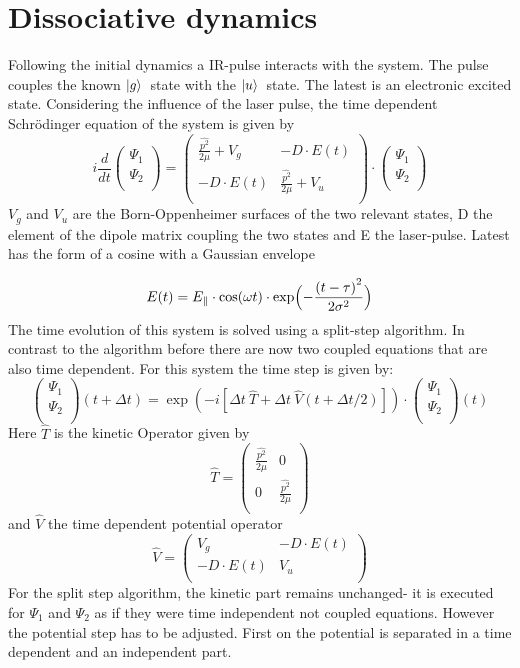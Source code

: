 \documentclass[12pt]{article}
\newcommand{\gr}{$\ket{g}$}
\newcommand{\us}{$\ket{u}$}
\newcommand{\psiv}{\begin{pmatrix}\Psi_1\\ \Psi_2\\ \end{pmatrix}}
\begin{document}
\section{Dissociative dynamics}
Following the initial dynamics a IR-pulse interacts with the system. The pulse couples  the known \gr \ state with the \us \ state. The latest is an electronic excited state. Considering the influence of the laser pulse, the time dependent Schr\"odinger equation of the system is given by
\begin{equation}
i
\frac{d}{dt}
\psiv
=
\begin{pmatrix}
\frac{\hat{p^2}}{2\mu}+V_g & -D\cdot E(t)\\
-D\cdot E(t) & \frac{\hat{p^2}}{2\mu}+V_u\\
\end{pmatrix}
\cdot
\psiv
\end{equation}
$V_g$ and $V_u$ are the Born-Oppenheimer surfaces of the two relevant states, D the element of the dipole matrix coupling the two states and E the laser-pulse.
Latest has the form of a cosine with a Gaussian envelope

\begin{equation}
   E(t)=E_\parallel \cdot \cos(\omega t) \cdot \exp \Bigl( -\frac{\left(t-\tau\right)^2}{2\sigma^2} \Bigr)
\end{equation}
The time evolution of this system is solved using a split-step algorithm. In contrast to the algorithm before there are now  two coupled equations that are also time dependent. For this system the time step is given by:
\begin{equation}
\psiv (t+\Delta t)= \exp(-i[\Delta t\ \hat{T} + \Delta t\ \hat{V}(t+\Delta t /2)]) \cdot \psiv(t)
\end{equation}
Here  $\hat{T}$   is the kinetic Operator given by
\begin{equation}\hat T=
\begin{pmatrix}
\frac{\hat{p^2}}{2\mu}& 0\\
0 & \frac{\hat{p^2}}{2\mu}\\
\end{pmatrix}
\end{equation}
and $\hat{V}$ the time dependent potential operator
\begin{equation}
\hat V=
\begin{pmatrix}
V_g & -D\cdot E(t)\\
-D\cdot E(t) & V_u\\
\end{pmatrix}
\end{equation}
For the split step algorithm, the kinetic part remains unchanged- it is executed for $\Psi_1$ and $\Psi_2$ as if they were time independent not coupled equations.
However the potential step has to be adjusted. First on the potential is separated in a time dependent and an independent part.
\end{document}
